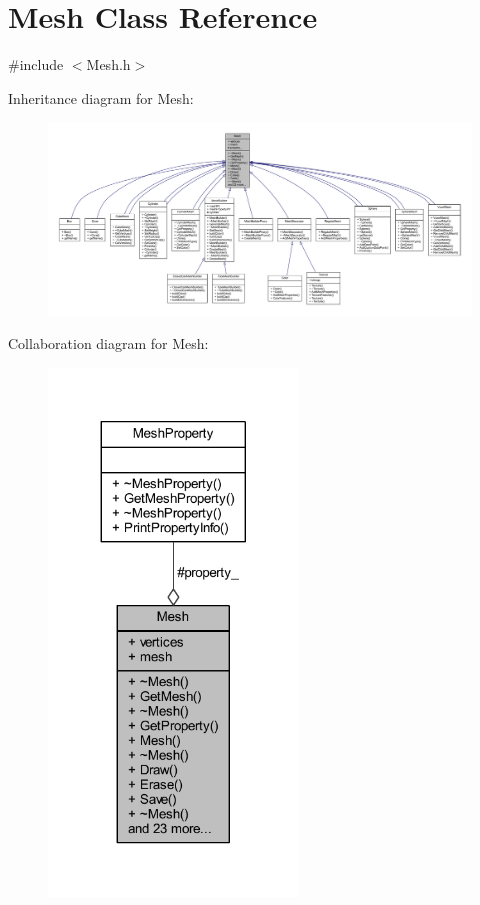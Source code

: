 \hypertarget{class_mesh}{}\section{Mesh Class Reference}
\label{class_mesh}


{\ttfamily \#include $<$Mesh.\+h$>$}



Inheritance diagram for Mesh\+:\nopagebreak
\begin{figure}[H]
\begin{center}
\leavevmode
\includegraphics[width=350pt]{class_mesh__inherit__graph}
\end{center}
\end{figure}


Collaboration diagram for Mesh\+:\nopagebreak
\begin{figure}[H]
\begin{center}
\leavevmode
\includegraphics[width=188pt]{class_mesh__coll__graph}
\end{center}
\end{figure}
